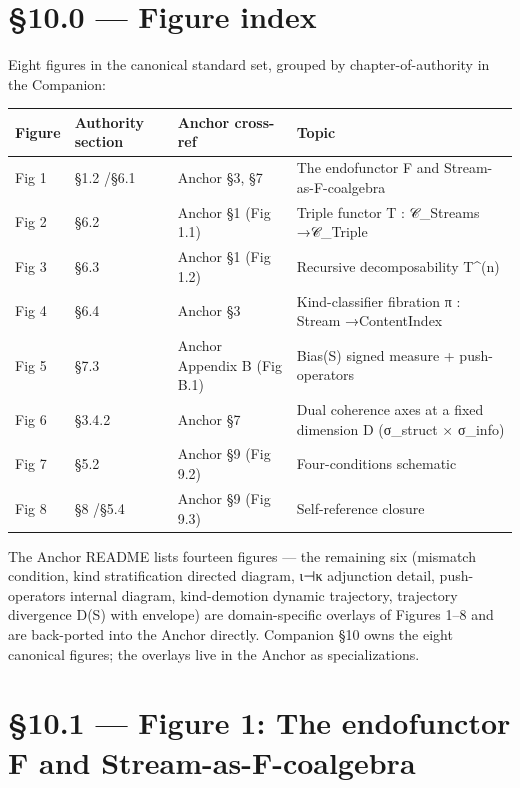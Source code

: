 \documentclass[11pt, openany]{book}
\newcommand{\sectionbreak}{\clearpage}
\begin{document}
\sectionbreak

\section{§10.0 --- Figure index}

Eight figures in the canonical standard set, grouped by chapter-of-authority in the Companion:

\begingroup\setlength{\tabcolsep}{3pt}\renewcommand{\arraystretch}{1.15}\footnotesize
\begin{center}
\begin{tabular}{p{0.55in} p{0.60in} p{0.95in} p{2.18in}}
\toprule
Figure & Authority section & Anchor cross-ref & Topic \\
\midrule
Fig 1 & §1.2 /\allowbreak  §6.1 & Anchor §3, §7 & The endofunctor F and Stream-as-F-coalgebra \\
Fig 2 & §6.2 & Anchor §1 (Fig 1.1) & Triple functor T : 𝒞\_\allowbreak{}Streams →\allowbreak  𝒞\_\allowbreak{}Triple \\
Fig 3 & §6.3 & Anchor §1 (Fig 1.2) & Recursive decomposability T\textasciicircum{}(n) \\
Fig 4 & §6.4 & Anchor §3 & Kind-classifier fibration π : Stream →\allowbreak  ContentIndex \\
Fig 5 & §7.3 & Anchor Appendix B (Fig B.1) & Bias(S) signed measure + push-operators \\
Fig 6 & §3.4.2 & Anchor §7 & Dual coherence axes at a fixed dimension D (σ\_\allowbreak{}struct × σ\_\allowbreak{}info) \\
Fig 7 & §5.2 & Anchor §9 (Fig 9.2) & Four-conditions schematic \\
Fig 8 & §8 /\allowbreak  §5.4 & Anchor §9 (Fig 9.3) & Self-reference closure \\
\bottomrule
\end{tabular}
\end{center}
\endgroup
The Anchor README lists fourteen figures --- the remaining six (mismatch condition, kind stratification directed diagram, ι⊣κ adjunction detail, push-operators internal diagram, kind-demotion dynamic trajectory, trajectory divergence D(S) with envelope) are domain-specific overlays of Figures 1–8 and are back-ported into the Anchor directly. Companion §10 owns the eight canonical figures; the overlays live in the Anchor as specializations.

\sectionbreak

\section{§10.1 --- Figure 1: The endofunctor F and Stream-as-F-coalgebra}
\end{document}
